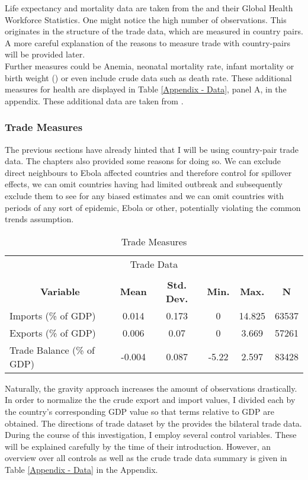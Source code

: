 \documentclass{article}
\begin{document}
Life expectancy and mortality data are taken from the \cite{whostatistics} and their Global Health Workforce Statistics. One might notice the high number of observations. This originates in the structure of the trade data, which are measured in country pairs. A more careful explanation of the reasons to measure trade with country-pairs will be provided later. \\
Further measures could be Anemia, neonatal mortality rate, infant mortality or birth weight (\cite{weil2014health}) or even include crude data such as death rate. These additional measures for health are displayed in Table \ref{Appendix - Data}, panel A, in the appendix. These additional data are taken from \cite{wdi}.

\subsubsection{Trade Measures}

The previous sections have already hinted that I will be using country-pair trade data. The chapters also provided some reasons for doing so. We can exclude direct neighbours to Ebola affected countries and therefore control for spillover effects, we can omit countries having had limited outbreak and subsequently exclude them to see for any biased estimates and we can omit countries with periods of any sort of epidemic, Ebola or other, potentially violating the common trends assumption. \\

\begin{table}[htbp]\centering \caption{Trade Measures \label{Trade Measures}}
\begin{tabular}{l c c c c c}\hline\hline
\multicolumn{6}{c}{Trade Data}\\ \\ \hline
\multicolumn{1}{c}{\textbf{Variable}} & \textbf{Mean}
 & \textbf{Std. Dev.}& \textbf{Min.} &  \textbf{Max.} & \textbf{N}\\ \hline
Imports (\% of GDP) & 0.014 & 0.173 & 0 & 14.825 & 63537\\
Exports (\% of GDP) & 0.006 & 0.07 & 0 & 3.669 & 57261\\
Trade Balance (\% of GDP) & -0.004 & 0.087 & -5.22 & 2.597 & 83428\\
\hline\end{tabular}
\end{table}
Naturally, the gravity approach increases the amount of observations drastically. In order to normalize the the crude export and import values, I divided each by the country's corresponding GDP value so that terms relative to GDP are obtained. The directions of trade dataset by the \cite{imfdot} provides the bilateral trade data. \\
During the course of this investigation, I employ several control variables. These will be explained carefully by the time of their introduction. However, an overview over all controls as well as the crude trade data summary is given in Table \ref{Appendix - Data} in the Appendix.
\end{document}
